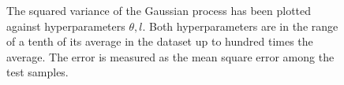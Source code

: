 \documentclass[a4paper,11pt]{article}
\begin{document}
\begin{figure}
  \begin{center}
    \caption{The squared variance of the Gaussian process has been plotted against hyperparameters $\theta, l$.  Both hyperparameters are in the range of a tenth of its average in the dataset up to hundred times the average.  The error is measured as the mean square error among the test samples.}
    \label{fig:ex2plot2var}
  \end{center}
\end{figure}
\end{document}
